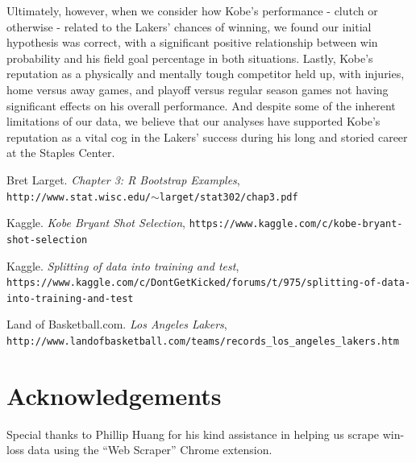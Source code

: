 \documentclass[paper=a4, fontsize=11pt]{scrartcl} %
\numberwithin{equation}{section} %
\numberwithin{figure}{section} %
\numberwithin{table}{section} %
\begin{document}
\hspace*{1cm}Ultimately, however, when we consider how Kobe's performance - clutch or otherwise - related to the Lakers' chances of winning, we found our initial hypothesis was correct, with a significant positive relationship between win probability and his field goal percentage in both situations. Lastly, Kobe's reputation as a physically and mentally tough competitor held up, with injuries, home versus away games, and playoff versus regular season games not having significant effects on his overall performance. And despite some of the inherent limitations of our data, we believe that our analyses have supported Kobe's reputation as a vital cog in the Lakers' success during his long and storied career at the Staples Center. 
\begin{thebibliography}{9}
	Bret Larget.
	\textit{Chapter 3: R Bootstrap Examples}, \\\texttt{http://www.stat.wisc.edu/$\sim$larget/stat302/chap3.pdf}
	
	Kaggle. 
	\textit{Kobe Bryant Shot Selection}, \texttt{https://www.kaggle.com/c/kobe-bryant-shot-selection}

	Kaggle. 
	\textit{Splitting of data into training and test},\\ \texttt{https://www.kaggle.com/c/DontGetKicked/forums/t/975/splitting-of-data-into-training-and-test}

	Land of Basketball.com.
	\textit{Los Angeles Lakers}, \\\texttt{http://www.landofbasketball.com/teams/records\_los\_angeles\_lakers.htm}
	


\end{thebibliography}
\section*{Acknowledgements}
\hspace*{1cm}Special thanks to Phillip Huang for his kind assistance in helping us scrape win-loss data using the ``Web Scraper'' Chrome extension.
\end{document}
